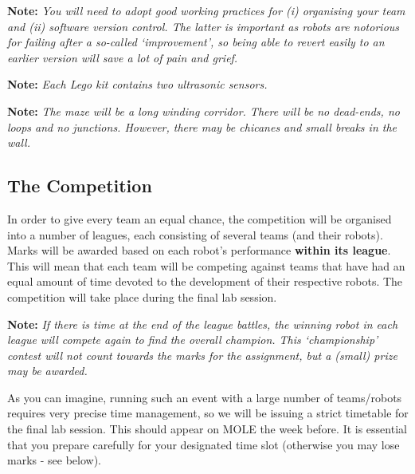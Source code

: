 \documentclass[hidelinks,a4paper,11pt]{article}
\begin{document}
{\bfseries Note:}  \emph{You will need to adopt good working practices for (i) organising your team and (ii) software version control.  The latter is important as robots are notorious for failing after a so-called `improvement', so being able to revert easily to an earlier version will save a lot of pain and grief.}

{\bfseries Note:}  \emph{Each Lego kit contains two ultrasonic sensors.}

{\bfseries Note:}  \emph{The maze will be a long winding corridor.  There will be no dead-ends, no loops and no junctions.  However, there may be chicanes and small breaks in the wall.}


\subsection{The Competition}

In order to give every team an equal chance, the competition will be organised into a number of leagues, each consisting of several teams (and their robots).  Marks will be awarded based on each robot's performance \textbf{within its league}.  This will mean that each team will be competing against teams that have had an equal amount of time devoted to the development of their respective robots.  The competition will take place during the final lab session.

{\bfseries Note:}  \emph{If there is time at the end of the league battles, the winning robot in each league will compete again to find the overall champion.  This `championship' contest will not count towards the marks for the assignment, but a (small) prize may be awarded.}

As you can imagine, running such an event with a large number of teams/robots requires very precise time management, so we will be issuing a strict timetable for the final lab session.  This should appear on MOLE the week before.  It is essential that you prepare carefully for your designated time slot (otherwise you may lose marks - see below).
\end{document}
